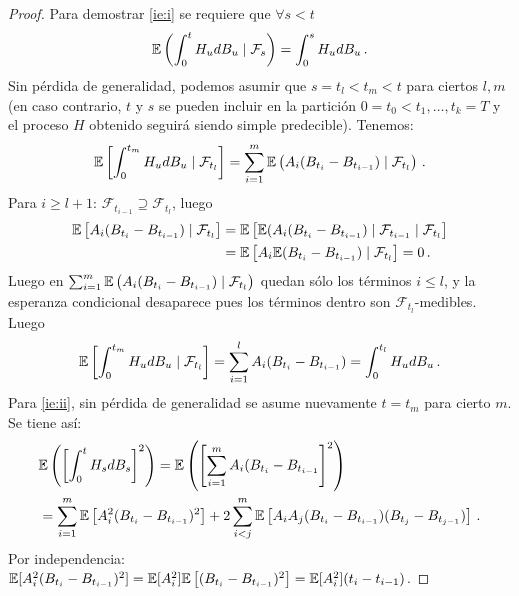 \begin{proof}
\gris
Para demostrar \ref{ie:i} se requiere que $\forall s < t$
\begin{equation*}
        \mathbb{E} \left( \int_{0}^{t} H_u dB_u  \mid  \mathcal{F}_s \right)  = \int_{0}^{s} H_u dB_u\,.
\end{equation*}
Sin pérdida de generalidad, podemos asumir que $s = t_{l} < t_m < t$ para ciertos $l,m$ (en caso contrario, $t$ y $s$ se pueden incluir en la partición $0 = t_0 < t_1, \ldots, t_k = T$ y el proceso $H$ obtenido seguirá siendo simple predecible). Tenemos:
\begin{equation*}
    \label{eq:*}
    \mathbb{E} \left[ \int_{0}^{t_m} H_u dB_u \mid \mathcal{F}_{t_l} \right] = \sum_{i=1}^{m} \mathbb{E} \left( A_i (B_{t_i} - B_{t_{i-1}}) \mid  \mathcal{F}_{t_l} \right)\,. 
\end{equation*}
Para $i \ge  l+1$: $\mathcal{F}_{t_{i-1}} \supseteq \mathcal{F}_{t_l}$, luego 
\begin{align*}
    \mathbb{E} \left[ A_i (B_{t_i} - B_{t_{i-1}}) \mid \mathcal{F}_{t_l} \right]  
    &= \mathbb{E} \left[ \mathbb{E} (A_{i}(B_{t_i} - B_{t_{i-1}}) \mid \mathcal{F}_{t_{i-1}}  \mid  \mathcal{F}_{t_l}  \right]  \\ 
    &= \mathbb{E} \left[ A_{i} \mathbb{E}( B_{t_i} - B_{t_{i-1}}) \mid \mathcal{F}_{t_l}\right] = 0\,.
\end{align*}
Luego en $\sum_{i=1}^{m} \mathbb{E} \left( A_i (B_{t_i} - B_{t_{i-1}}) \mid  \mathcal{F}_{t_l} \right)$ quedan sólo los términos $i \le l$, y la esperanza condicional desaparece pues
los términos dentro son $\mathcal{F}_{t_l}$-medibles. Luego
\begin{equation*}
    \mathbb{E} \left[ \int_{0}^{t_m} H_u dB_u  \mid \mathcal{F}_{t_l} \right] = \sum_{i=1}^{l} A_i (B_{t_i} -B_{t_{i-1}}) = \int_{0}^{t_l} H_u dB_u \,.
\end{equation*}
Para \ref{ie:ii}, sin pérdida de generalidad se asume nuevamente $t=t_m$ para cierto $m$. Se tiene 
así:
\begin{align*}
        &\mathbb{E} \left( \left[\int_{0}^{t} H_s dB_s \right]^2 \right)  
        = \mathbb{E} \left( \left[ \sum_{i=1}^{m} A_i(B_{t_i} -B_{t_{i-1}}\right]^2 \right) \\ 
        &= \sum_{i=1}^{m}\mathbb{E}\left[ A^2_i(B_{t_i} - B_{t_{i-1}})^2
        \right] + 2 \sum_{i<j}^{m} \mathbb{E} \left[ A_i A_j (B_{t_i}
        -B_{t_{i-1}})(B_{t_j} - B_{t_{j-1}} )  \right] \,.
\end{align*}
Por independencia: $\mathbb{E}[A_i^{2} (B_{t_i} - B_{t_{i-1}})^2 ] = \mathbb{E}[A_i^2]\mathbb{E}\left[(B_{t_i} - B_{t_{i-1}})^2\right] = \mathbb{E} [A_i^2](t_{i} - t_{i-1})$. 

\end{proof}
